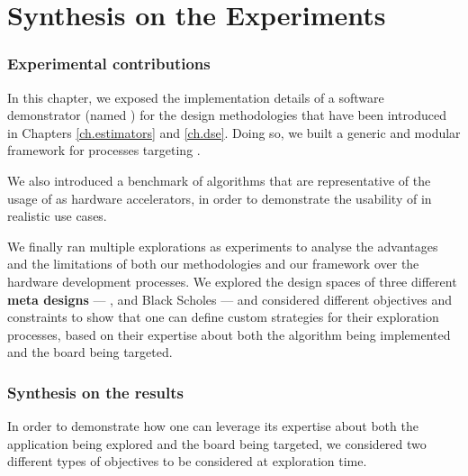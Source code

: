 
\clearpage
\section{Synthesis on the Experiments}
\label{ch.expe:sec.synthesis}
\vspace{-0.08cm}
    \subsubsection{Experimental contributions}
\vspace{-0.04cm}
        In this chapter, we exposed the implementation details of a software demonstrator (named ) for the design methodologies that have been introduced in Chapters \ref{ch.estimators} and \ref{ch.dse}.
        Doing so, we built a generic and modular framework for  processes targeting .

        We also introduced a benchmark of algorithms that are representative of the usage of  as hardware accelerators, in order to demonstrate the usability of  in realistic use cases.
        
        We finally ran multiple explorations as experiments to analyse the advantages and the limitations of both our methodologies and our framework over the hardware development processes.
        We explored the design spaces of three different {\bf meta designs} --- ,  and Black Scholes --- and considered different objectives and constraints to show that one can define custom strategies for their exploration processes, based on their expertise about both the algorithm being implemented and the  board being targeted.
    
\vspace{-0.08cm}
    \subsubsection{Synthesis on the results}
\vspace{-0.04cm}
        In order to demonstrate how one can leverage its expertise about both the application being explored and the  board being targeted, we considered two different types of objectives to be considered at exploration time.

